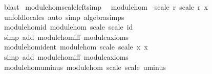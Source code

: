 \begin{isabellebody}
\ blast%
\endisatagproof
{\isafoldproof}%
%
\isadelimproof
\isanewline
%
\endisadelimproof
\isanewline
{}\isamarkupfalse%
\ module{\isacharunderscore}{\kern0pt}hom{\isacharunderscore}{\kern0pt}scale{\isacharunderscore}{\kern0pt}left{\isacharbrackleft}{\kern0pt}simp{\isacharbrackright}{\kern0pt}{\isacharcolon}{\kern0pt}\isanewline
\ \ {\isachardoublequoteopen}module{\isacharunderscore}{\kern0pt}hom\ {\isacharparenleft}{\kern0pt}{\isacharasterisk}{\kern0pt}{\isacharparenright}{\kern0pt}\ scale\ {\isacharparenleft}{\kern0pt}{\isasymlambda}r{\isachardot}{\kern0pt}\ scale\ r\ x{\isacharparenright}{\kern0pt}{\isachardoublequoteclose}\isanewline
%
\isadelimproof
\ \ %
\endisadelimproof
%
\isatagproof
{}\isamarkupfalse%
\ unfold{\isacharunderscore}{\kern0pt}locales\ {\isacharparenleft}{\kern0pt}auto\ simp{\isacharcolon}{\kern0pt}\ algebra{\isacharunderscore}{\kern0pt}simps{\isacharparenright}{\kern0pt}%
\endisatagproof
{\isafoldproof}%
%
\isadelimproof
\isanewline
%
\endisadelimproof
\isanewline
{}\isamarkupfalse%
\ module{\isacharunderscore}{\kern0pt}hom{\isacharunderscore}{\kern0pt}id{\isacharcolon}{\kern0pt}\ {\isachardoublequoteopen}module{\isacharunderscore}{\kern0pt}hom\ scale\ scale\ id{\isachardoublequoteclose}\isanewline
%
\isadelimproof
\ \ %
\endisadelimproof
%
\isatagproof
{}\isamarkupfalse%
\ {\isacharparenleft}{\kern0pt}simp\ add{\isacharcolon}{\kern0pt}\ module{\isacharunderscore}{\kern0pt}hom{\isacharunderscore}{\kern0pt}iff\ module{\isacharunderscore}{\kern0pt}axioms{\isacharparenright}{\kern0pt}%
\endisatagproof
{\isafoldproof}%
%
\isadelimproof
\isanewline
%
\endisadelimproof
\isanewline
{}\isamarkupfalse%
\ module{\isacharunderscore}{\kern0pt}hom{\isacharunderscore}{\kern0pt}ident{\isacharcolon}{\kern0pt}\ {\isachardoublequoteopen}module{\isacharunderscore}{\kern0pt}hom\ scale\ scale\ {\isacharparenleft}{\kern0pt}{\isasymlambda}x{\isachardot}{\kern0pt}\ x{\isacharparenright}{\kern0pt}{\isachardoublequoteclose}\isanewline
%
\isadelimproof
\ \ %
\endisadelimproof
%
\isatagproof
{}\isamarkupfalse%
\ {\isacharparenleft}{\kern0pt}simp\ add{\isacharcolon}{\kern0pt}\ module{\isacharunderscore}{\kern0pt}hom{\isacharunderscore}{\kern0pt}iff\ module{\isacharunderscore}{\kern0pt}axioms{\isacharparenright}{\kern0pt}%
\endisatagproof
{\isafoldproof}%
%
\isadelimproof
\isanewline
%
\endisadelimproof
\isanewline
{}\isamarkupfalse%
\ module{\isacharunderscore}{\kern0pt}hom{\isacharunderscore}{\kern0pt}uminus{\isacharcolon}{\kern0pt}\ {\isachardoublequoteopen}module{\isacharunderscore}{\kern0pt}hom\ scale\ scale\ uminus{\isachardoublequoteclose}\isanewline

\end{isabellebody}
